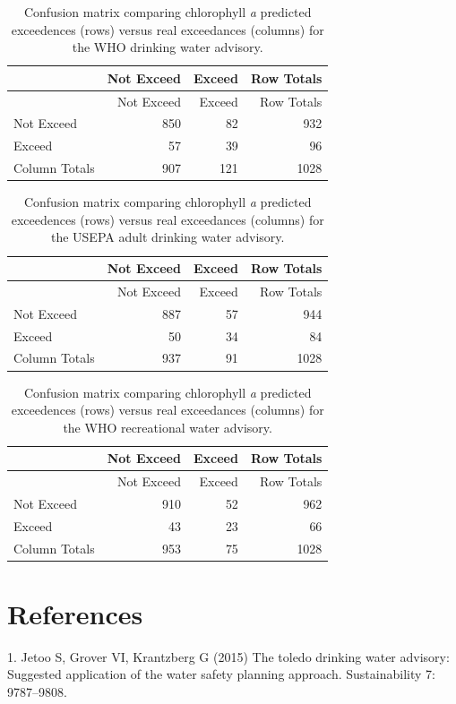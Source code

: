 \documentclass[11pt,]{article}
\begin{document}
\newpage

\begin{longtable}[c]{@{}lrrr@{}}
\caption{Confusion matrix comparing chlorophyll \textit{a} predicted
exceedences (rows) versus real exceedances (columns) for the WHO
drinking water advisory.
\label{tab:who_drink_conmat_table}}\tabularnewline
\toprule
& Not Exceed & Exceed & Row Totals\tabularnewline
\midrule
\endfirsthead
\toprule
& Not Exceed & Exceed & Row Totals\tabularnewline
\midrule
\endhead
Not Exceed & 850 & 82 & 932\tabularnewline
Exceed & 57 & 39 & 96\tabularnewline
Column Totals & 907 & 121 & 1028\tabularnewline
\bottomrule
\end{longtable}

\newpage

\begin{longtable}[c]{@{}lrrr@{}}
\caption{Confusion matrix comparing chlorophyll \textit{a} predicted
exceedences (rows) versus real exceedances (columns) for the USEPA adult
drinking water advisory. \label{tab:adult_conmat_table}}\tabularnewline
\toprule
& Not Exceed & Exceed & Row Totals\tabularnewline
\midrule
\endfirsthead
\toprule
& Not Exceed & Exceed & Row Totals\tabularnewline
\midrule
\endhead
Not Exceed & 887 & 57 & 944\tabularnewline
Exceed & 50 & 34 & 84\tabularnewline
Column Totals & 937 & 91 & 1028\tabularnewline
\bottomrule
\end{longtable}

\newpage

\begin{longtable}[c]{@{}lrrr@{}}
\caption{Confusion matrix comparing chlorophyll \textit{a} predicted
exceedences (rows) versus real exceedances (columns) for the WHO
recreational water advisory.
\label{tab:who_rec_conmat_table}}\tabularnewline
\toprule
& Not Exceed & Exceed & Row Totals\tabularnewline
\midrule
\endfirsthead
\toprule
& Not Exceed & Exceed & Row Totals\tabularnewline
\midrule
\endhead
Not Exceed & 910 & 52 & 962\tabularnewline
Exceed & 43 & 23 & 66\tabularnewline
Column Totals & 953 & 75 & 1028\tabularnewline
\bottomrule
\end{longtable}

\newpage

\section*{References}\label{references}

1. Jetoo S, Grover VI, Krantzberg G (2015) The toledo drinking water
advisory: Suggested application of the water safety planning approach.
Sustainability 7: 9787--9808.
\end{document}
